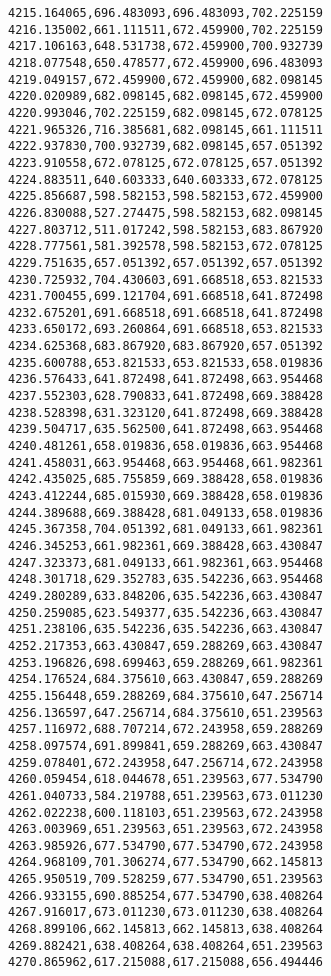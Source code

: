 \documentclass[11pt]{article}
\begin{document}
\begin{Verbatim}[commandchars=\\\{\}]
4215.164065,696.483093,696.483093,702.225159
4216.135002,661.111511,672.459900,702.225159
4217.106163,648.531738,672.459900,700.932739
4218.077548,650.478577,672.459900,696.483093
4219.049157,672.459900,672.459900,682.098145
4220.020989,682.098145,682.098145,672.459900
4220.993046,702.225159,682.098145,672.078125
4221.965326,716.385681,682.098145,661.111511
4222.937830,700.932739,682.098145,657.051392
4223.910558,672.078125,672.078125,657.051392
4224.883511,640.603333,640.603333,672.078125
4225.856687,598.582153,598.582153,672.459900
4226.830088,527.274475,598.582153,682.098145
4227.803712,511.017242,598.582153,683.867920
4228.777561,581.392578,598.582153,672.078125
4229.751635,657.051392,657.051392,657.051392
4230.725932,704.430603,691.668518,653.821533
4231.700455,699.121704,691.668518,641.872498
4232.675201,691.668518,691.668518,641.872498
4233.650172,693.260864,691.668518,653.821533
4234.625368,683.867920,683.867920,657.051392
4235.600788,653.821533,653.821533,658.019836
4236.576433,641.872498,641.872498,663.954468
4237.552303,628.790833,641.872498,669.388428
4238.528398,631.323120,641.872498,669.388428
4239.504717,635.562500,641.872498,663.954468
4240.481261,658.019836,658.019836,663.954468
4241.458031,663.954468,663.954468,661.982361
4242.435025,685.755859,669.388428,658.019836
4243.412244,685.015930,669.388428,658.019836
4244.389688,669.388428,681.049133,658.019836
4245.367358,704.051392,681.049133,661.982361
4246.345253,661.982361,669.388428,663.430847
4247.323373,681.049133,661.982361,663.954468
4248.301718,629.352783,635.542236,663.954468
4249.280289,633.848206,635.542236,663.430847
4250.259085,623.549377,635.542236,663.430847
4251.238106,635.542236,635.542236,663.430847
4252.217353,663.430847,659.288269,663.430847
4253.196826,698.699463,659.288269,661.982361
4254.176524,684.375610,663.430847,659.288269
4255.156448,659.288269,684.375610,647.256714
4256.136597,647.256714,684.375610,651.239563
4257.116972,688.707214,672.243958,659.288269
4258.097574,691.899841,659.288269,663.430847
4259.078401,672.243958,647.256714,672.243958
4260.059454,618.044678,651.239563,677.534790
4261.040733,584.219788,651.239563,673.011230
4262.022238,600.118103,651.239563,672.243958
4263.003969,651.239563,651.239563,672.243958
4263.985926,677.534790,677.534790,672.243958
4264.968109,701.306274,677.534790,662.145813
4265.950519,709.528259,677.534790,651.239563
4266.933155,690.885254,677.534790,638.408264
4267.916017,673.011230,673.011230,638.408264
4268.899106,662.145813,662.145813,638.408264
4269.882421,638.408264,638.408264,651.239563
4270.865962,617.215088,617.215088,656.494446

\end{Verbatim}
\end{document}
